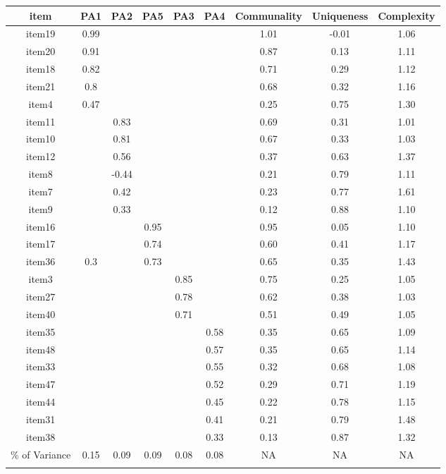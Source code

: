 \documentclass[
  english,
  man]{apa6}
\begin{document}
\begin{appendix}
\begin{table}[h]
\begin{center}
\begin{threeparttable}
{\begin{tabular}{ccccccccc}
\toprule
item & \multicolumn{1}{c}{PA1} & \multicolumn{1}{c}{PA2} & \multicolumn{1}{c}{PA5} & \multicolumn{1}{c}{PA3} & \multicolumn{1}{c}{PA4} & \multicolumn{1}{c}{Communality} & \multicolumn{1}{c}{Uniqueness} & \multicolumn{1}{c}{Complexity}\\
\midrule
item19 & 0.99 &  &  &  &  & 1.01 & -0.01 & 1.06\\
item20 & 0.91 &  &  &  &  & 0.87 & 0.13 & 1.11\\
item18 & 0.82 &  &  &  &  & 0.71 & 0.29 & 1.12\\
item21 & 0.8 &  &  &  &  & 0.68 & 0.32 & 1.16\\
item4 & 0.47 &  &  &  &  & 0.25 & 0.75 & 1.30\\
item11 &  & 0.83 &  &  &  & 0.69 & 0.31 & 1.01\\
item10 &  & 0.81 &  &  &  & 0.67 & 0.33 & 1.03\\
item12 &  & 0.56 &  &  &  & 0.37 & 0.63 & 1.37\\
item8 &  & -0.44 &  &  &  & 0.21 & 0.79 & 1.11\\
item7 &  & 0.42 &  &  &  & 0.23 & 0.77 & 1.61\\
item9 &  & 0.33 &  &  &  & 0.12 & 0.88 & 1.10\\
item16 &  &  & 0.95 &  &  & 0.95 & 0.05 & 1.10\\
item17 &  &  & 0.74 &  &  & 0.60 & 0.41 & 1.17\\
item36 & 0.3 &  & 0.73 &  &  & 0.65 & 0.35 & 1.43\\
item3 &  &  &  & 0.85 &  & 0.75 & 0.25 & 1.05\\
item27 &  &  &  & 0.78 &  & 0.62 & 0.38 & 1.03\\
item40 &  &  &  & 0.71 &  & 0.51 & 0.49 & 1.05\\
item35 &  &  &  &  & 0.58 & 0.35 & 0.65 & 1.09\\
item48 &  &  &  &  & 0.57 & 0.35 & 0.65 & 1.14\\
item33 &  &  &  &  & 0.55 & 0.32 & 0.68 & 1.08\\
item47 &  &  &  &  & 0.52 & 0.29 & 0.71 & 1.19\\
item44 &  &  &  &  & 0.45 & 0.22 & 0.78 & 1.15\\
item31 &  &  &  &  & 0.41 & 0.21 & 0.79 & 1.48\\
item38 &  &  &  &  & 0.33 & 0.13 & 0.87 & 1.32\\
\% of Variance & 0.15 & 0.09 & 0.09 & 0.08 & 0.08 & NA & NA & NA\\
\bottomrule
\addlinespace
\end{tabular}

}
\end{threeparttable}
\end{center}
\end{table}
\end{appendix}
\end{document}
